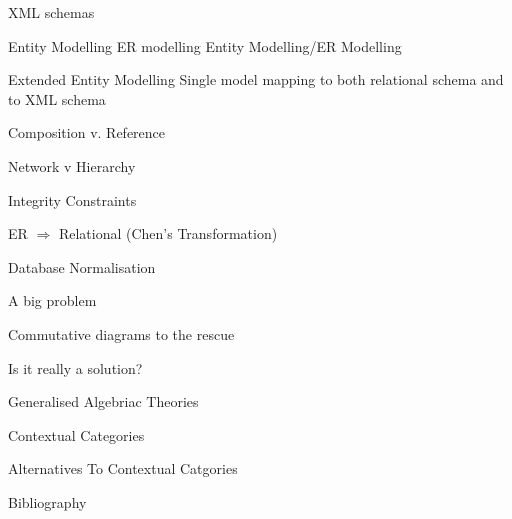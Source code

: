 \documentclass[xcolor=pst,dvips]{beamer}   %
\begin{document}
\begin{frame}{XML schemas}

\end{frame}


\begin{frame}{Entity Modelling ER modelling}
Entity Modelling/ER Modelling
\end{frame}

\begin{frame}{Extended Entity Modelling}
Single model mapping to both relational schema and to XML schema
\end{frame}
\begin{frame}{Composition v. Reference}
\end{frame}
\begin{frame}{Network v Hierarchy}
\end{frame}
\begin{frame}{Integrity Constraints}
\end{frame}
\begin{frame} {ER $\Longrightarrow$ Relational (Chen's Transformation)}
\end{frame}
\begin{frame}{Database Normalisation}
\end{frame}
\begin{frame}{A big problem}
\end{frame}
\begin{frame}{Commutative diagrams to the rescue}
\end{frame}
\begin{frame}{Is it really a solution?}
\end{frame}


\begin{frame}{Generalised Algebriac Theories}
\end{frame}
\begin{frame}{Contextual Categories}
\end{frame}

\begin{frame}{Alternatives To Contextual Catgories}
\end{frame}


\begin{frame}{Bibliography}

\end{frame}

\end{document}
